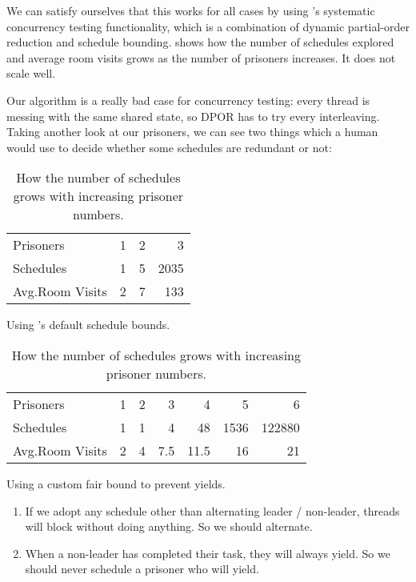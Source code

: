 We can satisfy ourselves that this works for all cases by using
\dejafu{}'s systematic concurrency testing functionality, which is a
combination of dynamic partial-order reduction and schedule bounding.
 shows how the number of schedules explored and
average room visits grows as the number of prisoners increases.  It
does not scale well.

Our algorithm is a really bad case for concurrency testing: every
thread is messing with the same shared state, so DPOR has to try every
interleaving.  Taking another look at our prisoners, we can see two
things which a human would use to decide whether some schedules are
redundant or not:

\begin{table}
\begin{subtable}{\textwidth}
  \centering
  \begin{tabular}{lrrr} \toprule
    Prisoners          & 1 & 2 &    3 \\
    Schedules          & 1 & 5 & 2035 \\
    Avg.\@ Room Visits & 2 & 7 &  133 \\ \bottomrule
  \end{tabular}
  \caption{Using \dejafu{}'s default schedule bounds.}\label{tbl:100slow}
\end{subtable}

\vspace{2.5em}

\begin{subtable}{\textwidth}
  \centering
  \begin{tabular}{lrrrrrr} \toprule
    Prisoners          & 1 & 2 & 3   &  4   &    5 &      6 \\
    Schedules          & 1 & 1 & 4   & 48   & 1536 & 122880 \\
    Avg.\@ Room Visits & 2 & 4 & 7.5 & 11.5 &   16 &     21 \\ \bottomrule
  \end{tabular}
  \caption{Using a custom fair bound to prevent yields.}\label{tbl:100fast}
\end{subtable}
\caption{How the number of schedules grows with increasing prisoner numbers.}\label{tbl:100slowfast}
\end{table}

\begin{enumerate}
\item If we adopt any schedule other than alternating leader /
  non-leader, threads will block without doing anything.  So we should
  alternate.
\item When a non-leader has completed their task, they will always
  yield.  So we should never schedule a prisoner who will yield.
\end{enumerate}

